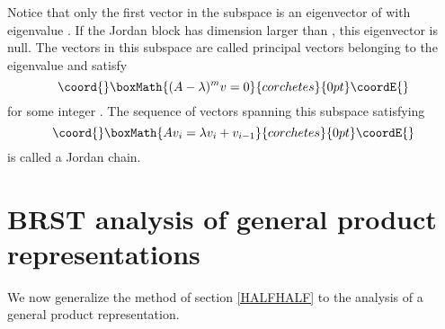 \documentclass[a4paper,dvips,12pt]{article}
\begin{document}
    Notice that only the first vector in the subspace is an
    eigenvector of \coordHE{} with eigenvalue \myHighlight{$\lambda$}\coordHE{}.
    If the Jordan block has dimension
    larger than \coordHE{}, this eigenvector is null.
    The vectors \coordHE{} in this subspace are
    called principal vectors belonging to the eigenvalue \myHighlight{$\lambda$}\coordHE{} and
    satisfy
    \[\coord{}\boxMath{
        (A - \lambda)^m v = 0
    }{corchetes}{0pt}\coordE{}\]
    for some integer \coordHE{}.  The sequence of vectors \coordHE{} spanning
    this subspace satisfying
    \[\coord{}\boxMath{
        A v_{i} = \lambda v_i + v_{i-1}
    }{corchetes}{0pt}\coordE{}\]
    is called a Jordan chain.

    \section{BRST analysis of general product representations}

    We now generalize the method of section \ref{HALFHALF} to
    the analysis of a general product representation.
\end{document}
